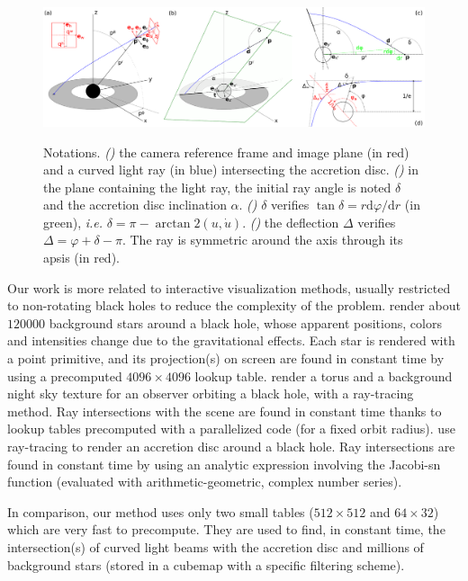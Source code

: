 \documentclass{document}
\newcommand{\diff}{\mathrm d}
\begin{document}
\begin{figure}[htb]
	\centering
	\includegraphics[width=\linewidth]{figures/notations}
	{\label{fig:notations:a}}
	{\label{fig:notations:b}}
	{\label{fig:notations:c}}
	{\label{fig:notations:d}}
	\caption{Notations. {\em ()} the camera reference 
	frame and image plane (in red) and a curved light ray (in blue) intersecting 
	the accretion disc. {\em ()} in the plane containing 
	the light ray, the initial ray angle is noted $\delta$ and the accretion disc 
	inclination $\alpha$. {\em ()} $\delta$ verifies 
	$\tan\delta = r \diff\varphi / \diff r$ (in green), {\em i.e.} 
	$\delta = \pi - \arctan2(u, \dot{u})$. {\em ()} the 
	deflection $\Delta$ verifies $\Delta = \varphi + \delta - \pi$. The ray is 
	symmetric around the axis through its apsis (in red).}
\end{figure}

Our work is more related to interactive visualization methods, usually 
restricted to non-rotating black holes to reduce the complexity of the problem.
\cite{Muller2010} render about $120000$ background stars around a black hole, 
whose apparent positions, colors and intensities change due to the 
gravitational effects. Each star is rendered with a point primitive, and its 
projection(s) on screen are found in constant time by using a precomputed 
$4096\times4096$ lookup table. \cite{Muller2011} render a torus and a 
background night sky texture for an observer orbiting a black hole, with a 
ray-tracing method. Ray intersections with the scene are found in constant time 
thanks to lookup tables precomputed with a parallelized code (for a fixed orbit 
radius). \cite{Muller2012} use ray-tracing to render an accretion disc around a 
black hole. Ray intersections are found in constant time by using an analytic 
expression involving the Jacobi-sn function (evaluated with 
arithmetic-geometric, complex number series).

In comparison, our method uses only two small tables ($512\times512$ and 
$64\times32$) which are very fast to precompute. They are used to find, in 
constant time, the intersection(s) of curved light beams with the accretion 
disc and millions of background stars (stored in a cubemap with a specific 
filtering scheme).
  
\end{document}
